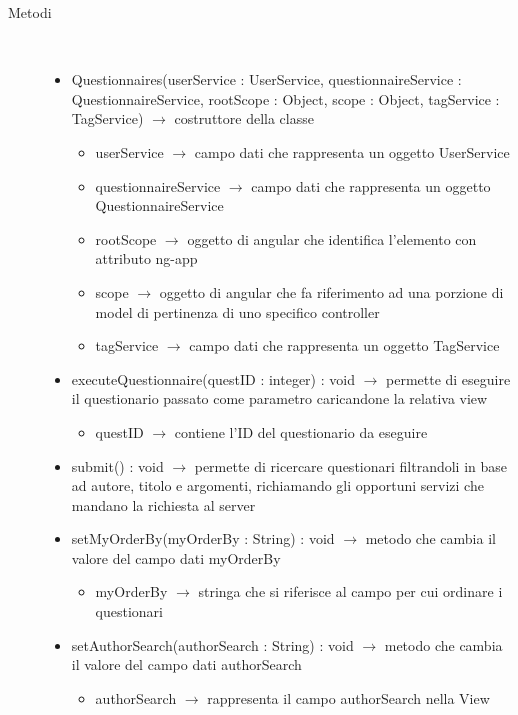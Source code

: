 \begin{description}
\item[Metodi] \hfill \\
\vspace{-7mm}
\begin{itemize}
	\item Questionnaires(userService : UserService, questionnaireService : QuestionnaireService, rootScope : Object, scope : Object, tagService : TagService) $\rightarrow$ costruttore della classe\begin{itemize}
		\item userService $\rightarrow$ campo dati che rappresenta un oggetto UserService
		\item questionnaireService $\rightarrow$ campo dati che rappresenta un oggetto QuestionnaireService
		\item rootScope $\rightarrow$ oggetto di angular che identifica l’elemento con attributo ng-app
		\item scope $\rightarrow$ oggetto di angular che fa riferimento ad una porzione di model di pertinenza di uno specifico controller
		\item tagService $\rightarrow$ campo dati che rappresenta un oggetto TagService 
	\end{itemize}
	
	\item executeQuestionnaire(questID : integer) : void $\rightarrow$ permette di eseguire il questionario passato come parametro caricandone la relativa view\begin{itemize}
		\item questID $\rightarrow$ contiene l'ID del questionario da eseguire
	\end{itemize}
	
	\item submit() : void $\rightarrow$ permette di ricercare questionari filtrandoli in base ad autore, titolo e argomenti, richiamando gli opportuni servizi che mandano la richiesta al server
	\item setMyOrderBy(myOrderBy : String) : void $\rightarrow$ metodo che cambia il valore del campo dati myOrderBy\begin{itemize}
		\item myOrderBy $\rightarrow$ stringa che si riferisce al campo per cui ordinare i questionari
	\end{itemize}
	
	\item setAuthorSearch(authorSearch : String) : void $\rightarrow$ metodo che cambia il valore del campo dati authorSearch\begin{itemize}
		\item authorSearch $\rightarrow$ rappresenta il campo authorSearch nella View
	\end{itemize}
	

\end{itemize}
\end{description}
